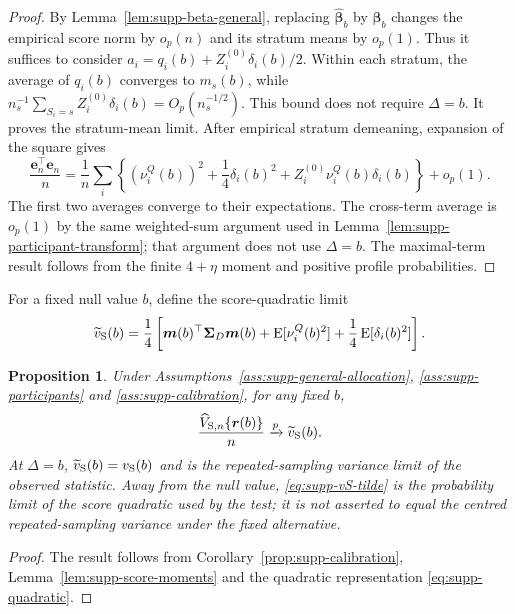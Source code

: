 \documentclass[12pt,a4paper]{article}
\newtheorem{proposition}{Proposition}
\theoremstyle{definition}
\theoremstyle{remark}\newtheorem{remark}{Remark}
\numberwithin{equation}{section}
\newcommand{\E}{\operatorname{E}}
\begin{document}
\begin{proof}
By Lemma~\ref{lem:supp-beta-general}, replacing $\widehat{\bm\beta}_b$ by $\bm\beta_b$ changes the empirical score norm by $o_p(n)$ and its stratum means by $o_p(1)$. Thus it suffices to consider
$a_i=q_i(b)+Z_i^{(0)}\delta_i(b)/2$. Within each stratum, the average of $q_i(b)$ converges to $m_s(b)$, while
$n_s^{-1}\sum_{S_i=s}Z_i^{(0)}\delta_i(b)=O_p(n_s^{-1/2})$. This bound does not require $\Delta=b$. It proves the stratum-mean limit. After empirical stratum demeaning, expansion of the square gives
\[
 \frac{\bm e_n^\top\bm e_n}{n}
 =\frac1n\sum_i\left\{(\nu_i^Q(b))^2+\frac14\delta_i(b)^2
       +Z_i^{(0)}\nu_i^Q(b)\delta_i(b)\right\}+o_p(1).
\]
The first two averages converge to their expectations. The cross-term average is $o_p(1)$ by the same weighted-sum argument used in Lemma~\ref{lem:supp-participant-transform}; that argument does not use $\Delta=b$. The maximal-term result follows from the finite $4+\eta$ moment and positive profile probabilities.
\end{proof}

For a fixed null value $b$, define the score-quadratic limit
\begin{equation}\label{eq:supp-vS-tilde}
\widetilde v_{\rm S}(b)
=
\frac14\left[
\bm m(b)^\top\bm\Sigma_D\bm m(b)
+\E[\nu_i^Q(b)^2]
+\frac14\E[\delta_i(b)^2]
\right].
\end{equation}

\begin{proposition}\label{prop:supp-fixed-b-quadratic}
Under Assumptions~\ref{ass:supp-general-allocation}, \ref{ass:supp-participants} and \ref{ass:supp-calibration}, for any fixed $b$,
\[
\frac{\widehat V_{{\rm S},n}\{\bm r(b)\}}{n}
\xrightarrow{p}
\widetilde v_{\rm S}(b).
\]
At $\Delta=b$, $\widetilde v_{\rm S}(b)=v_{\rm S}(b)$ and is the repeated-sampling variance limit of the observed statistic. Away from the null value, \eqref{eq:supp-vS-tilde} is the probability limit of the score quadratic used by the test; it is not asserted to equal the centred repeated-sampling variance under the fixed alternative.
\end{proposition}

\begin{proof}
The result follows from Corollary~\ref{prop:supp-calibration}, Lemma~\ref{lem:supp-score-moments} and the quadratic representation \eqref{eq:supp-quadratic}.
\end{proof}
\end{document}
